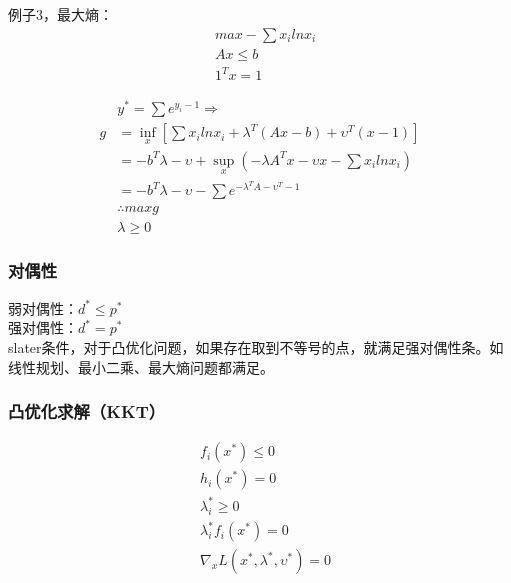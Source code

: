 \documentclass[UTF8]{article}
\begin{document}
例子3，最大熵：
\begin{equation}
\begin{split}
&max -\sum x_ilnx_i\\
&Ax\leqslant b\\
&1^Tx=1
\end{split}
\end{equation}

\begin{equation}
\begin{split}
&y^*=\sum e^{y_i-1} \Rightarrow\\
g&=\inf_x \left[ \sum x_ilnx_i+\lambda^T(Ax-b)+\upsilon^T(x-1) \right]\\
&=-b^T\lambda-\upsilon+\sup_x \left( -\lambda A^Tx-\upsilon x-\sum x_ilnx_i \right)\\
&=-b^T\lambda -\upsilon-\sum e^{-\lambda^TA-\upsilon^T-1}\\
&\therefore max g \\
&\lambda \geqslant 0
\end{split}
\end{equation}
 
\subsubsection{对偶性}
弱对偶性：$d^*\leqslant p^*$\\
强对偶性：$d^* = p^*$\\
slater条件，对于凸优化问题，如果存在取到不等号的点，就满足强对偶性条。如线性规划、最小二乘、最大熵问题都满足。

\subsubsection{凸优化求解（KKT）}
\begin{equation}
\begin{split}
&f_i(x^*)\leqslant0\\
&h_i(x^*)=0\\
&\lambda_i^*\geqslant 0\\
&\lambda_i^*f_i(x^*)=0\\
&\nabla_x L(x^*,\lambda^*,\upsilon^*)=0
\end{split}
\end{equation}
 
\end{document}
